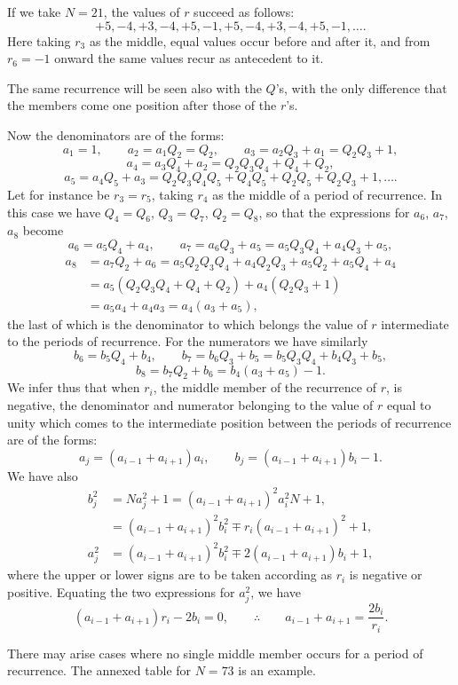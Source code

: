\documentclass[11pt]{article}
\newcommand{\scanpage}[2]{\clearpage\setcounter{footnote}{0}\noindent{\footnotesize\color{gray}PDF page #1 · #2}\par\medskip}
\newcommand{\scanfooter}{}
\begin{document}
If we take $N=21$, the values of $r$ succeed as follows:
\[
+5,-4,+3,-4,+5,-1,+5,-4,+3,-4,+5,-1,\ldots.
\]
Here taking $r_3$ as the middle, equal values occur before and after it, and from $r_6=-1$ onward the same values recur as antecedent to it.

The same recurrence will be seen also with the $Q$'s, with the only difference that the members come one position after those of the $r$'s.

Now the denominators are of the forms:
\[
a_1=1,\qquad a_2=a_1Q_2=Q_2,\qquad a_3=a_2Q_3+a_1=Q_2Q_3+1,
\]
\[
a_4=a_3Q_4+a_2=Q_2Q_3Q_4+Q_4+Q_2,
\]
\[
a_5=a_4Q_5+a_3=Q_2Q_3Q_4Q_5+Q_4Q_5+Q_2Q_5+Q_2Q_3+1,\ldots.
\]
Let for instance be $r_3=r_5$, taking $r_4$ as the middle of a period of recurrence. In this case we have $Q_4=Q_6$, $Q_3=Q_7$, $Q_2=Q_8$, so that the expressions for $a_6$, $a_7$, $a_8$ become
\[
a_6=a_5Q_4+a_4,\qquad a_7=a_6Q_3+a_5=a_5Q_3Q_4+a_4Q_3+a_5,
\]
\[
\begin{aligned}
a_8&=a_7Q_2+a_6=a_5Q_2Q_3Q_4+a_4Q_2Q_3+a_5Q_2+a_5Q_4+a_4\\
&=a_5(Q_2Q_3Q_4+Q_4+Q_2)+a_4(Q_2Q_3+1)\\
&=a_5a_4+a_4a_3=a_4(a_3+a_5),
\end{aligned}
\]
the last of which is the denominator to which belongs the value of $r$ intermediate to the periods of recurrence. For the numerators we have similarly
\[
b_6=b_5Q_4+b_4,\qquad b_7=b_6Q_3+b_5=b_5Q_3Q_4+b_4Q_3+b_5,
\]
\[
b_8=b_7Q_2+b_6=b_4(a_3+a_5)-1.
\]
We infer thus that when $r_i$, the middle member of the recurrence of $r$, is negative, the denominator and numerator belonging to the value of $r$ equal to unity which comes to the intermediate position between the periods of recurrence are of the forms:
\[
a_j=(a_{i-1}+a_{i+1})a_i,\qquad b_j=(a_{i-1}+a_{i+1})b_i-1.
\]
We have also
\[
\begin{aligned}
b_j^2&=Na_j^2+1=(a_{i-1}+a_{i+1})^2a_i^2N+1,\\
&=(a_{i-1}+a_{i+1})^2b_i^2\mp r_i(a_{i-1}+a_{i+1})^2+1,\\
a_j^2&=(a_{i-1}+a_{i+1})^2b_i^2\mp2(a_{i-1}+a_{i+1})b_i+1,
\end{aligned}
\]
where the upper or lower signs are to be taken according as $r_i$ is negative or positive. Equating the two expressions for $a_j^2$, we have
\[
(a_{i-1}+a_{i+1})r_i-2b_i=0,
\qquad\therefore\qquad a_{i-1}+a_{i+1}=\frac{2b_i}{r_i}.
\]
\scanfooter

\scanpage{0241}{Chapter 31, printed page 227}
There may arise cases where no single middle member occurs for a period of recurrence. The annexed table for $N=73$ is an example.
\end{document}
